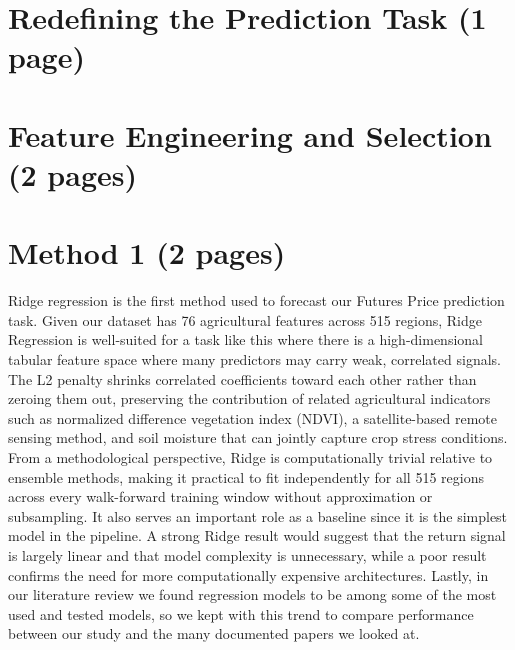 \documentclass[pdflatex,sn-mathphys-num, oneside]{sn-jnl}%
\theoremstyle{thmstyleone}%
\theoremstyle{thmstyletwo}%
\theoremstyle{thmstylethree}%
\begin{document}
\clearpage

\section{Redefining the Prediction Task (1 page)}\label{sec3}

\clearpage

\section{Feature Engineering and Selection (2 pages)}\label{sec3}

\clearpage

\section{Method 1 (2 pages)}\label{sec3}
Ridge regression is the first method used to forecast our Futures Price prediction task. Given our dataset has 76 agricultural features across 515 regions, Ridge Regression is well-suited for a task like this where there is a high-dimensional tabular feature space where many predictors may carry weak, correlated signals. The L2 penalty shrinks correlated coefficients toward each other rather than zeroing them out, preserving the contribution of related agricultural indicators such as normalized difference vegetation index (NDVI), a satellite-based remote sensing method, and soil moisture that can jointly capture crop stress conditions. From a methodological perspective, Ridge is computationally trivial relative to ensemble methods, making it practical to fit independently for all 515 regions across every walk-forward training window without approximation or subsampling. It also serves an important role as a baseline since it is the simplest model in the pipeline. A strong Ridge result would suggest that the return signal is largely linear and that model complexity is unnecessary, while a poor result confirms the need for more computationally expensive architectures. Lastly, in our literature review we found regression models to be among some of the most used and tested models, so we kept with this trend to compare performance between our study and the many documented papers we looked at. 
\end{document}
